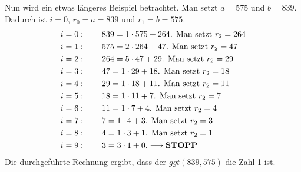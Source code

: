 Nun wird ein etwas längeres Beispiel betrachtet. Man setzt $a = 575$ und $b = 839$. Dadurch ist  $i = 0$, $r_{0} = a = 839$ und $r_{1} = b = 575$.
\begin{align*}
&i = 0: \qquad 839 = 1 \cdot 575 + 264\text{. Man setzt } r_{2} = 264\\
&i = 1: \qquad 575 = 2 \cdot 264 + 47\text{. Man setzt } r_{2} = 47\\
&i = 2: \qquad 264 = 5 \cdot 47 + 29\text{. Man setzt } r_{2} = 29\\
&i = 3: \qquad 47 = 1 \cdot 29 + 18\text{. Man setzt } r_{2} = 18\\
&i = 4: \qquad 29 = 1 \cdot 18 + 11\text{. Man setzt } r_{2} = 11\\
&i = 5: \qquad 18 = 1 \cdot 11 + 7\text{. Man setzt } r_{2} = 7\\
&i = 6: \qquad 11 = 1 \cdot 7 + 4\text{. Man setzt } r_{2} = 4\\
&i = 7: \qquad 7 = 1 \cdot 4 + 3\text{. Man setzt } r_{2} = 3\\
&i = 8: \qquad 4 = 1 \cdot 3 + 1\text{. Man setzt } r_{2} = 1\\
&i = 9: \qquad 3 = 3 \cdot 1 + 0\text{.}\longrightarrow\text{\textbf{STOPP}}
\end{align*}
Die durchgeführte Rechnung ergibt, dass der $ggt(839, 575)$ die Zahl 1 ist.\\


